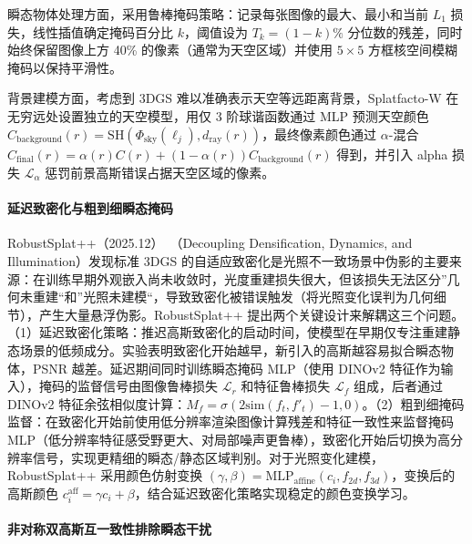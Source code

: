 瞬态物体处理方面，采用鲁棒掩码策略：记录每张图像的最大、最小和当前 $L_1$ 损失，线性插值确定掩码百分比 $k$，阈值设为 $T_k = (1-k)\%$ 分位数的残差，同时始终保留图像上方 40\% 的像素（通常为天空区域）并使用 $5 \times 5$ 方框核空间模糊掩码以保持平滑性。

背景建模方面，考虑到 3DGS 难以准确表示天空等远距离背景，Splatfacto-W 在无穷远处设置独立的天空模型，用仅 3 阶球谐函数通过 MLP 预测天空颜色 $C_{\text{background}}(r) = \text{SH}(\Phi_{\text{sky}}(\ell_j), d_{\text{ray}}(r))$，最终像素颜色通过 $\alpha$-混合 $C_{\text{final}}(r) = \alpha(r) C(r) + (1-\alpha(r)) C_{\text{background}}(r)$ 得到，并引入 alpha 损失 $\mathcal{L}_\alpha$ 惩罚前景高斯错误占据天空区域的像素。

\paragraph{延迟致密化与粗到细瞬态掩码}

RobustSplat++（2025.12）~\cite{2512_04815}（Decoupling Densification, Dynamics, and Illumination）发现标准 3DGS 的自适应致密化是光照不一致场景中伪影的主要来源：在训练早期外观嵌入尚未收敛时，光度重建损失很大，但该损失无法区分”几何未重建“和”光照未建模“，导致致密化被错误触发（将光照变化误判为几何细节），产生大量悬浮伪影。RobustSplat++ 提出两个关键设计来解耦这三个问题。（1）延迟致密化策略：推迟高斯致密化的启动时间，使模型在早期仅专注重建静态场景的低频成分。实验表明致密化开始越早，新引入的高斯越容易拟合瞬态物体，PSNR 越差。延迟期间同时训练瞬态掩码 MLP（使用 DINOv2 特征作为输入），掩码的监督信号由图像鲁棒损失 $\mathcal{L}_r$ 和特征鲁棒损失 $\mathcal{L}_f$ 组成，后者通过 DINOv2 特征余弦相似度计算：$M_f = \sigma(2 \text{sim}(f_t, f'_t) - 1, 0)$。（2）粗到细掩码监督：在致密化开始前使用低分辨率渲染图像计算残差和特征一致性来监督掩码 MLP（低分辨率特征感受野更大、对局部噪声更鲁棒），致密化开始后切换为高分辨率信号，实现更精细的瞬态/静态区域判别。对于光照变化建模，RobustSplat++ 采用颜色仿射变换 $(\gamma, \beta) = \text{MLP}_\text{affine}(c_i, f_{2d}, f_{3d})$，变换后的高斯颜色 $c_i^{\text{aff}} = \gamma c_i + \beta$，结合延迟致密化策略实现稳定的颜色变换学习。

\paragraph{非对称双高斯互一致性排除瞬态干扰}

